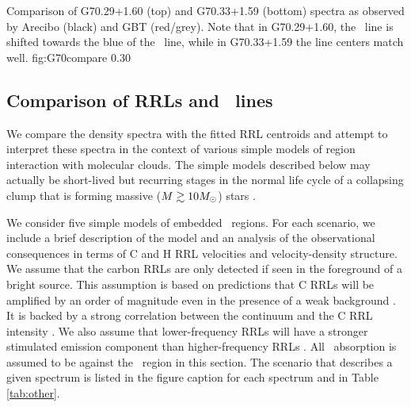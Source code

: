 {Comparison of G70.29+1.60 (top) and G70.33+1.59 (bottom) spectra as observed
by Arecibo (black) and GBT (red/grey).  Note that in G70.29+1.60, the \twotwo\
line is shifted towards the blue of the \oneone\ line, while in G70.33+1.59 the
line centers match well.}
{fig:G70compare}
{0.3}{0}


\subsection{Comparison of RRLs and \formaldehyde\ lines}
\label{sec:scenarios}
We compare the density spectra with the fitted RRL centroids and attempt to
interpret these spectra in the context of various simple models of 
region interaction with molecular clouds.  The simple models described below
may actually be short-lived but recurring stages in the normal life cycle of a
collapsing clump that is forming massive ($M\gtrsim10 M_{\odot}$) stars
\citep{Peters2010}.


We consider five simple models of embedded \uchii\ regions.  For each scenario,
we include a brief description of the model and an analysis of the
observational consequences in terms of C and H RRL velocities and
velocity-density structure.  We assume that the carbon RRLs are only detected
if seen in the foreground of a bright source.  This assumption is based on
predictions that C RRLs will be amplified by an order of magnitude even in the
presence of a weak background \citep{Natta1994}.   It is backed by a strong
correlation between the continuum and the C RRL intensity  \citep{Roshi2005}.
We also assume that lower-frequency RRLs will have a stronger stimulated
emission component than higher-frequency RRLs \citep{Lockman1978}.  All
\formaldehyde\ absorption is assumed to be against the \uchii\ region in this
section.  The scenario that describes a given spectrum is listed in the figure
caption for each spectrum and in Table \ref{tab:other}.


